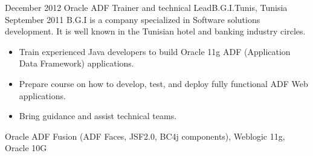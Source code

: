 \begin{experiences}
  \emptySeparator
  \experience
    {December 2012}   {Oracle ADF Trainer and technical Lead}{B.G.I.}{Tunis, Tunisia}
    {September 2011} {B.G.I is a company specialized in Software solutions development. It is well known in the Tunisian hotel and banking industry circles.}
                    {
                      \begin{itemize}
                        \item Train experienced Java developers to build Oracle 11g ADF (Application Data Framework) applications.
                        \item Prepare course on how to develop, test, and deploy fully functional ADF Web applications.
                        \item Bring guidance and assist technical teams.
                      \end{itemize}
                    }
                    {Oracle ADF Fusion (ADF Faces, JSF2.0, BC4j components), Weblogic 11g, Oracle 10G}
  \emptySeparator
\end{experiences}
